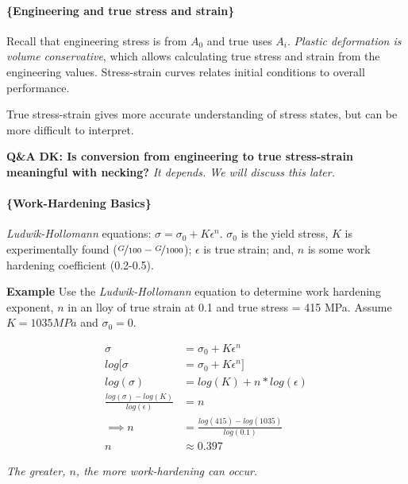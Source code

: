 \documentclass[
]{article}
\begin{document}
\hypertarget{engineering-and-true-stress-and-strain}{%
\paragraph{\{Engineering and true stress and
strain\}}\label{engineering-and-true-stress-and-strain}}

Recall that engineering stress is from \(A_{0}\) and true uses
\(A_{i}\). \textit{Plastic deformation is volume conservative}, which
allows calculating true stress and strain from the engineering values.
Stress-strain curves relates initial conditions to overall performance.

{True stress-strain gives more accurate understanding of stress states,
but can be more difficult to interpret.}

\textbf{Q\&A}
\textbf{DK: Is conversion from engineering to true stress-strain meaningful with necking?}
\textit{It depends. We will discuss this later.}

\hypertarget{work-hardening-basics}{%
\paragraph{\{Work-Hardening Basics\}}\label{work-hardening-basics}}

\textit{Ludwik-Hollomann} equations:
\(\sigma = \sigma_{0} + K\epsilon^{n}\). \(\sigma_{0}\) is the yield
stress, \(K\) is experimentally found
(\(\nicefrac{G}{100}-\nicefrac{G}{1000}\)); \(\epsilon\) is true strain;
and, \(n\) is some work hardening coefficient (0.2-0.5).

\textbf{Example} Use the \textit{Ludwik-Hollomann} equation to determine
work hardening exponent, \(n\) in an lloy of true strain at 0.1 and true
stress = 415 MPa. Assume \(K = 1035 MPa\) and \(\sigma_{0} = 0\).

\begin{align*}
    \sigma &= \sigma_{0} + K\epsilon^{n} \\
    log[\sigma &= \sigma_{0} + K\epsilon^{n}] \\
    log(\sigma) &= log(K) + n*log(\epsilon) \\
    \frac{log(\sigma) - log(K)}{log(\epsilon)} &= n \\
    \implies n &= \frac{log(415) - log(1035)}{log(0.1)} \\
    n &\approx 0.397
\end{align*}

\textit{The greater, $n$, the more work-hardening can occur.}
\end{document}
